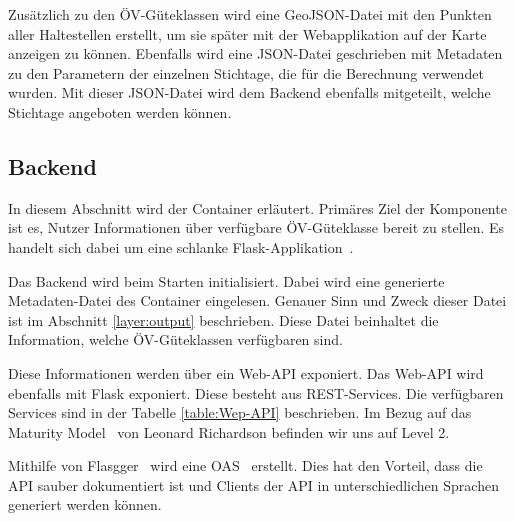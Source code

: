 Zusätzlich zu den \acs{ÖV}-Güteklassen wird eine GeoJSON-Datei mit den Punkten aller Haltestellen erstellt, um sie später mit der Webapplikation auf der Karte anzeigen zu können.
Ebenfalls wird eine JSON-Datei geschrieben mit Metadaten zu den Parametern der einzelnen Stichtage, die für die Berechnung verwendet wurden.
Mit dieser JSON-Datei wird dem Backend ebenfalls mitgeteilt, welche Stichtage angeboten werden können.

\subsection{Backend}
\label{Implementation:Backend}

In diesem Abschnitt wird der Container  erläutert.
Primäres Ziel der Komponente ist es, Nutzer Informationen über verfügbare \acs{ÖV}-Güteklasse bereit zu stellen.
Es handelt sich dabei um eine schlanke Flask-Applikation~\cite{flask}.

Das Backend wird beim Starten initialisiert.
Dabei wird eine generierte Metadaten-Datei des Container  eingelesen.
Genauer Sinn und Zweck dieser Datei ist im Abschnitt \ref{layer:output} beschrieben.
Diese Datei beinhaltet die Information, welche \acs{ÖV}-Güteklassen verfügbaren sind.

Diese Informationen werden über ein Web-\ac{API} exponiert.
Das Web-\ac{API} wird ebenfalls mit Flask exponiert.
Diese besteht aus \acl{REST}-Services.
Die verfügbaren Services sind in der Tabelle \ref{table:Wep-API} beschrieben.
Im Bezug auf das Maturity Model~\cite{maturity_model} von Leonard Richardson befinden wir uns auf Level 2.

Mithilfe von Flasgger~\cite{flasgger} wird eine \ac{OAS}~\cite{open-api-specificaiton} erstellt.
Dies hat den Vorteil, dass die \ac{API} sauber dokumentiert ist und Clients der \ac{API} in unterschiedlichen Sprachen generiert werden können.